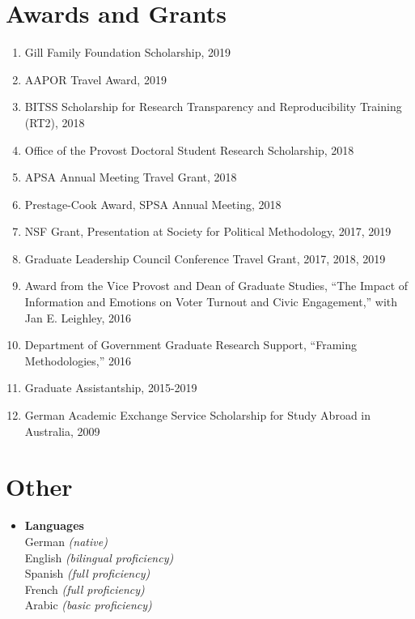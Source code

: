 \documentclass[11pt]{article}
\begin{document}
\begin{flushleft}
\section*{Awards and Grants}

\begin{enumerate}[leftmargin=!,labelindent=20pt,itemindent=-20pt]
\item[] Gill Family Foundation Scholarship, 2019
\vspace{-0.27cm}
\item[] AAPOR Travel Award, 2019
\vspace{-0.27cm}
\item[] BITSS Scholarship for Research Transparency and Reproducibility Training (RT2), 2018 
\vspace{-0.27cm}
\item[] Office of the Provost Doctoral Student Research Scholarship, 2018
\vspace{-0.27cm}
\item[] APSA Annual Meeting Travel Grant, 2018
\vspace{-0.27cm}
\item[] Prestage-Cook Award, SPSA Annual Meeting, 2018
\vspace{-0.27cm}
\item[] NSF Grant, Presentation at Society for Political Methodology, 2017, 2019
\vspace{-0.27cm}
\item[] Graduate Leadership Council Conference Travel Grant, 2017, 2018, 2019
\vspace{-0.27cm}
\item[] Award from the Vice Provost and Dean of Graduate Studies, ``The Impact of Information and Emotions on Voter Turnout and Civic Engagement,'' with Jan E. Leighley, 2016
\vspace{-0.27cm}
\item[] Department of Government Graduate Research Support, ``Framing Methodologies,'' 2016
\vspace{-0.27cm}
\item[] Graduate Assistantship, 2015-2019
\vspace{-0.27cm}
\item [] German Academic Exchange Service Scholarship for Study Abroad in Australia, 2009
\end{enumerate}




\section*{Other}

\begin{itemize}
\item[] \textbf{Languages}\\
German \textit{(native)} \\
English \textit{(bilingual proficiency)} \\
Spanish \textit{(full proficiency)} \\
French \textit{(full proficiency)} \\
Arabic \textit{(basic proficiency)} \\
\end{itemize}



\pagestyle{myheadings}

\end{flushleft}
 
\end{document}
